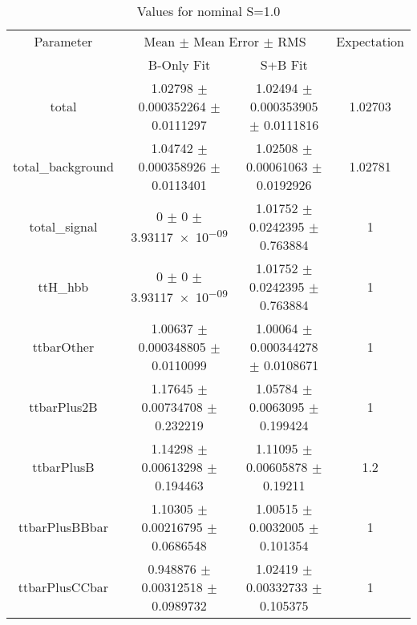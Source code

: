 \begin{table}
\centering
\caption{Values for nominal S=1.0}
\begin{tabular}{cccc}
\toprule
Parameter & \multicolumn{2}{c}{Mean $\pm$ Mean Error $\pm$ RMS} & Expectation\\
 & B-Only Fit & S+B Fit & \\
\midrule
total & \num{1.02798} $\pm$ \num{0.000352264} $\pm$ \num{0.0111297} & \num{1.02494} $\pm$ \num{0.000353905} $\pm$ \num{0.0111816} & \num{1.02703}\\
total\_background & \num{1.04742} $\pm$ \num{0.000358926} $\pm$ \num{0.0113401} & \num{1.02508} $\pm$ \num{0.00061063} $\pm$ \num{0.0192926} & \num{1.02781}\\
total\_signal & \num{0} $\pm$ \num{0} $\pm$ \num{3.93117e-09} & \num{1.01752} $\pm$ \num{0.0242395} $\pm$ \num{0.763884} & \num{1}\\
ttH\_hbb & \num{0} $\pm$ \num{0} $\pm$ \num{3.93117e-09} & \num{1.01752} $\pm$ \num{0.0242395} $\pm$ \num{0.763884} & \num{1}\\
ttbarOther & \num{1.00637} $\pm$ \num{0.000348805} $\pm$ \num{0.0110099} & \num{1.00064} $\pm$ \num{0.000344278} $\pm$ \num{0.0108671} & \num{1}\\
ttbarPlus2B & \num{1.17645} $\pm$ \num{0.00734708} $\pm$ \num{0.232219} & \num{1.05784} $\pm$ \num{0.0063095} $\pm$ \num{0.199424} & \num{1}\\
ttbarPlusB & \num{1.14298} $\pm$ \num{0.00613298} $\pm$ \num{0.194463} & \num{1.11095} $\pm$ \num{0.00605878} $\pm$ \num{0.19211} & \num{1.2}\\
ttbarPlusBBbar & \num{1.10305} $\pm$ \num{0.00216795} $\pm$ \num{0.0686548} & \num{1.00515} $\pm$ \num{0.0032005} $\pm$ \num{0.101354} & \num{1}\\
ttbarPlusCCbar & \num{0.948876} $\pm$ \num{0.00312518} $\pm$ \num{0.0989732} & \num{1.02419} $\pm$ \num{0.00332733} $\pm$ \num{0.105375} & \num{1}\\
\bottomrule
\end{tabular}
\end{table}